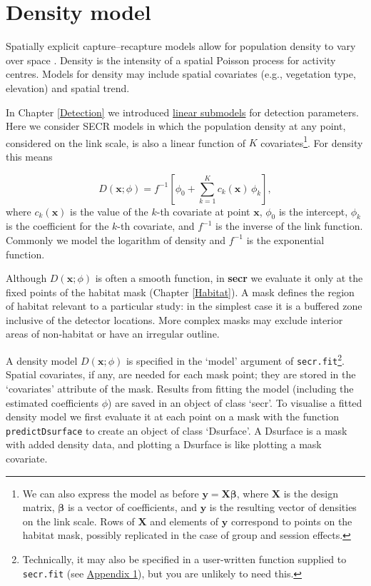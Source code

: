 \documentclass[
]{book}
\begin{document}
\chapter{Density model}\label{Density}


\renewcommand{\vec}[1]{\mathbf{#1}}

Spatially explicit capture--recapture models allow for population density to vary over space \citep{be08}. Density is the intensity of a spatial Poisson process for activity centres. Models for density may include spatial covariates (e.g., vegetation type, elevation) and spatial trend.

In Chapter \ref{Detection} we introduced \hyperref[linear-submodels]{linear submodels} for detection parameters. Here we consider SECR models in which the population density at any point, considered on the link scale, is also a linear function of \(K\) covariates\footnote{We can also express the model as before \(\mathbf{y} = \mathbf{X} \pmb {\beta}\), where \(\mathbf{X}\) is the design matrix, \(\pmb{\beta}\) is a vector of coefficients, and \(\mathbf{y}\) is the resulting vector of densities on the link scale. Rows of \(\mathbf{X}\) and elements of \(\mathbf{y}\) correspond to points on the habitat mask, possibly replicated in the case of group and session effects.}. For density this means

\begin{equation}
D(\mathbf{x}; \phi) = f^{-1}[\phi_0 + \sum_{k=1}^K c_k(\mathbf{x}) \, \phi_k],
\end{equation}
where \(c_k(\mathbf{x})\) is the value of the \(k\)-th covariate at point \(\mathbf{x}\), \(\phi_0\) is the intercept, \(\phi_k\) is the coefficient for the \(k\)-th covariate, and \(f^{-1}\) is the inverse of the link function. Commonly we model the logarithm of density and \(f^{-1}\) is the exponential function.

Although \(D(\mathbf{x};\phi)\) is often a smooth function, in \textbf{secr} we evaluate it only at the fixed points of the habitat mask (Chapter \ref{Habitat}). A mask defines the region of habitat relevant to a particular study: in the simplest case it is a buffered zone inclusive of the detector locations. More complex masks may exclude interior areas of non-habitat or have an irregular outline.

A density model \(D(\mathbf{x};\phi)\) is specified in the `model' argument of \texttt{secr.fit}\footnote{Technically, it may also be specified in a user-written function supplied to
  \texttt{secr.fit} (see \hyperref[userfnappendix]{Appendix 1}), but you are unlikely to need this.}. Spatial covariates, if any, are needed for each mask point; they are stored in the `covariates' attribute of the mask. Results from fitting the model (including the estimated coefficients \(\phi\)) are saved in an object of class `secr'. To visualise a fitted
density model we first evaluate it at each point on a mask with the function \texttt{predictDsurface} to create an object of class `Dsurface'. A Dsurface is a mask with added density data, and plotting a Dsurface is like plotting a mask covariate.
\end{document}

